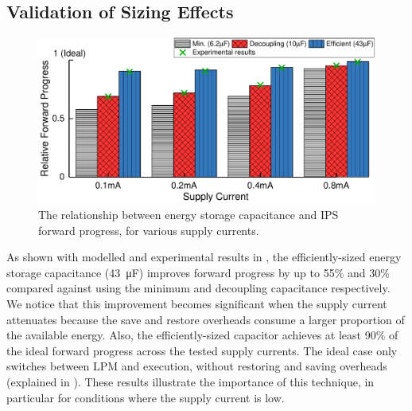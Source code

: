 \subsection{Validation of Sizing Effects}

\begin{figure}
    \centering
    \includegraphics[width=\columnwidth]{ch3_sizingeffect/figures/ImprValidColorFig1}
    \caption{The relationship between energy storage capacitance and IPS forward progress, for various supply currents. }
    \label{fig:imprvalid1}
\end{figure}

As shown with modelled and experimental results in , the efficiently-sized energy storage capacitance (\SI{43}{\micro\farad}) improves forward progress by up to 55\% and 30\% compared against using the minimum and decoupling capacitance respectively. 
We notice that this improvement becomes significant when the supply current attenuates because the save and restore overheads consume a larger proportion of the available energy. 
Also, the efficiently-sized capacitor achieves at least 90\% of the ideal forward progress across the tested supply currents.
The ideal case only switches between LPM and execution, without restoring and saving overheads (explained in ). 
These results illustrate the importance of this technique, in particular for conditions where the supply current is low.
